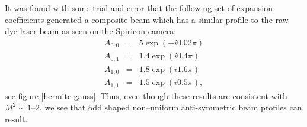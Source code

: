 It was found with some trial and error that the following set of expansion coefficients generated a composite beam which has a similar profile to the raw dye laser beam as seen on the Spiricon camera:
\begin{eqnarray}
A_{0,0} &=& 5\exp{(-i0.02\pi)}\\
A_{0,1} &=& 1.4\exp{(i0.4\pi)}\\
A_{1,0} &=& 1.8\exp{(i1.6\pi)}\\
A_{1,1} &=& 1.5\exp{(i0.5\pi)},
\end{eqnarray}
see figure \ref{hermite-gauss}. Thus, even though these results are consistent with $M^2\sim1$--$2$, we see that odd shaped non--uniform anti-symmetric beam profiles can result.

